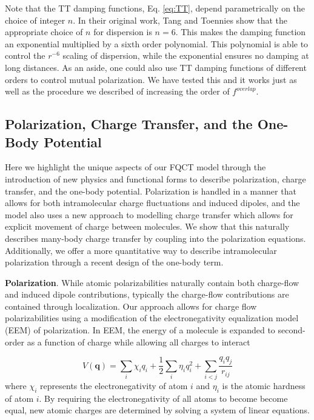 \documentclass[journal=jctcce,manuscript=article]{achemso}
\begin{document}
Note that the TT damping functions, Eq. \ref{eq:TT}, depend parametrically on
the choice of integer $n$. In their original work, Tang and Toennies show that the appropriate choice
of $n$ for dispersion is $n=6$. This makes the damping function an exponential multiplied by a sixth order polynomial.
This polynomial is able to control the $r^{-6}$ scaling of dispersion, while the exponential ensures no
damping at long distances. As an aside, one could also use TT damping functions of different orders to control
mutual polarization. We have tested this and it works just as well as the procedure we
described of increasing the order of $f^{overlap}$.


\subsection*{Polarization, Charge Transfer, and the One-Body Potential}
Here we highlight the unique aspects of our FQCT model through the introduction of new physics and functional forms to describe polarization, charge transfer, and the one-body potential.  Polarization is handled in a manner that allows for both intramolecular charge fluctuations and induced dipoles, and the model also uses a new approach to modelling charge transfer which allows for
explicit movement of charge between molecules. We show that this naturally
describes many-body charge transfer by coupling into the polarization equations.
Additionally, we offer a more quantitative way to describe intramolecular polarization through a recent design of the one-body term.

\textbf{Polarization}. While atomic polarizabilities naturally contain both charge-flow and induced dipole
contributions\cite{stone1985distributedb}, typically the charge-flow contributions
are contained through localization.\cite{ruth1994localization} Our approach allows for charge flow polarizabilities using a modification of the electronegativity
equalization model (EEM) of polarization.\cite{mortier1986electronegativity} In EEM,
the energy of a molecule is expanded to second-order as a function of charge while allowing
all charges to interact

\begin{equation}
  V(\bm{q})=\sum_i \chi_i q_i + \frac12 \sum_i \eta_i q_i^2 + \sum_{i<j} \frac{q_i q_j}{r_{ij}}
  \label{eq:eem}
\end{equation}
where $\chi_i$ represents the electronegativity of atom $i$ and
$\eta_i$ is the atomic hardness of atom $i$. By requiring the electronegativity of all atoms
to become become equal, new atomic charges are determined by solving a system of linear equations. 
\end{document}
